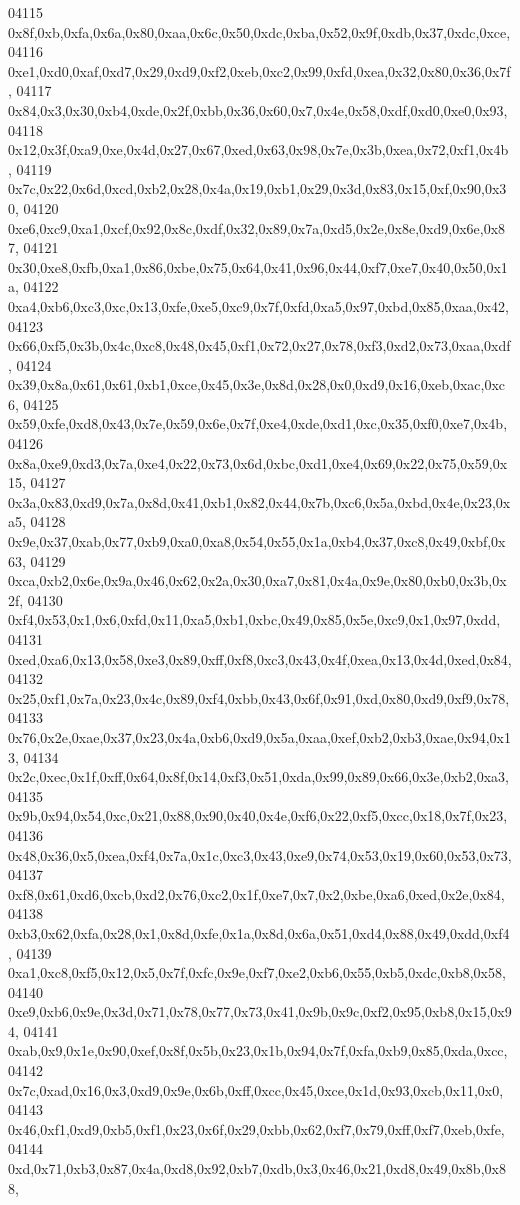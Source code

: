 \begin{DoxyCode}
04115   0x8f,0xb,0xfa,0x6a,0x80,0xaa,0x6c,0x50,0xdc,0xba,0x52,0x9f,0xdb,0x37,0xdc,0xce,
04116   0xe1,0xd0,0xaf,0xd7,0x29,0xd9,0xf2,0xeb,0xc2,0x99,0xfd,0xea,0x32,0x80,0x36,0x7f,
04117   0x84,0x3,0x30,0xb4,0xde,0x2f,0xbb,0x36,0x60,0x7,0x4e,0x58,0xdf,0xd0,0xe0,0x93,
04118   0x12,0x3f,0xa9,0xe,0x4d,0x27,0x67,0xed,0x63,0x98,0x7e,0x3b,0xea,0x72,0xf1,0x4b,
04119   0x7c,0x22,0x6d,0xcd,0xb2,0x28,0x4a,0x19,0xb1,0x29,0x3d,0x83,0x15,0xf,0x90,0x30,
04120   0xe6,0xc9,0xa1,0xcf,0x92,0x8c,0xdf,0x32,0x89,0x7a,0xd5,0x2e,0x8e,0xd9,0x6e,0x87,
04121   0x30,0xe8,0xfb,0xa1,0x86,0xbe,0x75,0x64,0x41,0x96,0x44,0xf7,0xe7,0x40,0x50,0x1a,
04122   0xa4,0xb6,0xc3,0xc,0x13,0xfe,0xe5,0xc9,0x7f,0xfd,0xa5,0x97,0xbd,0x85,0xaa,0x42,
04123   0x66,0xf5,0x3b,0x4c,0xc8,0x48,0x45,0xf1,0x72,0x27,0x78,0xf3,0xd2,0x73,0xaa,0xdf,
04124   0x39,0x8a,0x61,0x61,0xb1,0xce,0x45,0x3e,0x8d,0x28,0x0,0xd9,0x16,0xeb,0xac,0xc6,
04125   0x59,0xfe,0xd8,0x43,0x7e,0x59,0x6e,0x7f,0xe4,0xde,0xd1,0xc,0x35,0xf0,0xe7,0x4b,
04126   0x8a,0xe9,0xd3,0x7a,0xe4,0x22,0x73,0x6d,0xbc,0xd1,0xe4,0x69,0x22,0x75,0x59,0x15,
04127   0x3a,0x83,0xd9,0x7a,0x8d,0x41,0xb1,0x82,0x44,0x7b,0xc6,0x5a,0xbd,0x4e,0x23,0xa5,
04128   0x9e,0x37,0xab,0x77,0xb9,0xa0,0xa8,0x54,0x55,0x1a,0xb4,0x37,0xc8,0x49,0xbf,0x63,
04129   0xca,0xb2,0x6e,0x9a,0x46,0x62,0x2a,0x30,0xa7,0x81,0x4a,0x9e,0x80,0xb0,0x3b,0x2f,
04130   0xf4,0x53,0x1,0x6,0xfd,0x11,0xa5,0xb1,0xbc,0x49,0x85,0x5e,0xc9,0x1,0x97,0xdd,
04131   0xed,0xa6,0x13,0x58,0xe3,0x89,0xff,0xf8,0xc3,0x43,0x4f,0xea,0x13,0x4d,0xed,0x84,
04132   0x25,0xf1,0x7a,0x23,0x4c,0x89,0xf4,0xbb,0x43,0x6f,0x91,0xd,0x80,0xd9,0xf9,0x78,
04133   0x76,0x2e,0xae,0x37,0x23,0x4a,0xb6,0xd9,0x5a,0xaa,0xef,0xb2,0xb3,0xae,0x94,0x13,
04134   0x2c,0xec,0x1f,0xff,0x64,0x8f,0x14,0xf3,0x51,0xda,0x99,0x89,0x66,0x3e,0xb2,0xa3,
04135   0x9b,0x94,0x54,0xc,0x21,0x88,0x90,0x40,0x4e,0xf6,0x22,0xf5,0xcc,0x18,0x7f,0x23,
04136   0x48,0x36,0x5,0xea,0xf4,0x7a,0x1c,0xc3,0x43,0xe9,0x74,0x53,0x19,0x60,0x53,0x73,
04137   0xf8,0x61,0xd6,0xcb,0xd2,0x76,0xc2,0x1f,0xe7,0x7,0x2,0xbe,0xa6,0xed,0x2e,0x84,
04138   0xb3,0x62,0xfa,0x28,0x1,0x8d,0xfe,0x1a,0x8d,0x6a,0x51,0xd4,0x88,0x49,0xdd,0xf4,
04139   0xa1,0xc8,0xf5,0x12,0x5,0x7f,0xfc,0x9e,0xf7,0xe2,0xb6,0x55,0xb5,0xdc,0xb8,0x58,
04140   0xe9,0xb6,0x9e,0x3d,0x71,0x78,0x77,0x73,0x41,0x9b,0x9c,0xf2,0x95,0xb8,0x15,0x94,
04141   0xab,0x9,0x1e,0x90,0xef,0x8f,0x5b,0x23,0x1b,0x94,0x7f,0xfa,0xb9,0x85,0xda,0xcc,
04142   0x7c,0xad,0x16,0x3,0xd9,0x9e,0x6b,0xff,0xcc,0x45,0xce,0x1d,0x93,0xcb,0x11,0x0,
04143   0x46,0xf1,0xd9,0xb5,0xf1,0x23,0x6f,0x29,0xbb,0x62,0xf7,0x79,0xff,0xf7,0xeb,0xfe,
04144   0xd,0x71,0xb3,0x87,0x4a,0xd8,0x92,0xb7,0xdb,0x3,0x46,0x21,0xd8,0x49,0x8b,0x88,

\end{DoxyCode}
